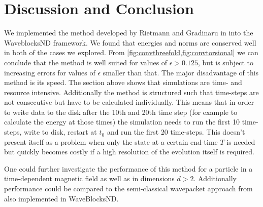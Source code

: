 \documentclass[11pt, a4paper, oneside]{article}
\begin{document}
\section{Discussion and Conclusion}
We implemented the method developed by Rietmann and Gradinaru in  into the WaveblocksND framework. We found that energies and norms are conserved well in both of the cases we explored.
From \cref{fig:convthreefold,fig:convtorsional} we can conclude that the method is well suited for values of $\epsilon > 0.125$, but is subject to increasing errors for values of $\epsilon$ smaller than that.\newline
The major disadvantage of this method is its speed. The section above shows that simulations are time- and resource intensive. Additionally the method is structured such that time-steps are not consecutive but have to be calculated individually. This means that in order to write data to the disk after the 10th and 20th time step (for example to calculate the energy at those times) the simulation needs to run the first 10 time-steps, write to disk, restart at $t_0$ and run the first 20 time-steps. This doesn't present itself as a problem when only the state at a certain end-time $T$ is needed but quickly becomes costly if a high resolution of the evolution itself is required.

One could further investigate the performance of this method for a particle in a time-dependent magnetic field as well as in dimensions $d > 2$. Additionally performance could be compared to the semi-classical wavepacket approach from  also implemented in WaveBlocksND.
\end{document}
